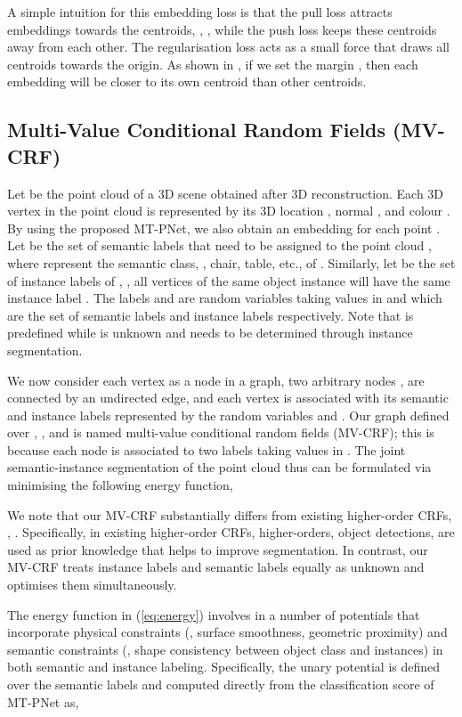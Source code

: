 \documentclass[10pt,twocolumn,letterpaper]{article}
\begin{document}
A simple intuition for this embedding loss is that the pull loss
 attracts embeddings towards the centroids, \ie,
, while the push loss  keeps these
centroids away from each other. The regularisation loss  acts
as a small force that draws all centroids towards the origin. As shown in
\cite{de-discriminative-arxiv17}, if we set the margin ,
then each embedding will be closer to its own centroid than other centroids.

\subsection{Multi-Value Conditional Random Fields (MV-CRF)}

Let  be the point cloud of a 3D scene obtained after 3D
reconstruction. Each 3D vertex  in the point cloud is represented by its 3D
location , normal
, and colour
. By using the proposed MT-PNet, we
also obtain an embedding  for each point
. Let  be the set of semantic labels that need
to be assigned to the point cloud , where  represent the semantic
class, \eg, chair, table, etc., of . Similarly, let
 be the set of instance labels of , \ie, all
vertices of the same object instance will have the same instance label
. The labels  and  are random variables taking values in
 and  which are the set of semantic labels and instance labels
respectively. Note that  is predefined while  is unknown and needs to be
determined through instance segmentation.

We now consider each vertex  as a node in a graph, two arbitrary
nodes ,  are connected by an undirected edge, and each vertex  is
associated with its semantic and instance labels represented by the random
variables  and . Our graph defined over , , and  is
named multi-value conditional random fields (MV-CRF); this is because each node
 is associated to two labels  taking values in
. The joint semantic-instance segmentation of the point cloud 
thus can be formulated via minimising the following energy function,


We note that our MV-CRF substantially differs from existing higher-order CRFs,
\eg, \cite{ladicky-what-eccv10, fidler-describing-cvpr12, arnab-hocrf-eccv16,
  pham-rpss-wacv19}. Specifically, in existing higher-order CRFs, higher-orders,
\eg object detections, are used as prior knowledge that helps to improve
segmentation. In contrast, our MV-CRF treats instance labels and semantic labels
equally as unknown and optimises them simultaneously.

The energy function  in (\ref{eq:energy}) involves in a number of
potentials that incorporate physical constraints (\eg, surface smoothness,
geometric proximity) and semantic constraints (\eg, shape consistency between
object class and instances) in both semantic and instance
labeling. Specifically, the unary potential  is defined over the
semantic labels  and computed directly from the classification score of
MT-PNet as,
\end{document}

